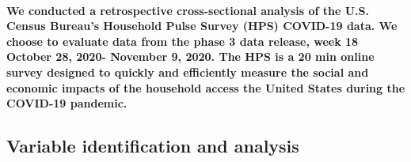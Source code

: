\documentclass[
  12pt,
]{article}
\begin{document}
\hypertarget{we-conducted-a-retrospective-cross-sectional-analysis-of-the-u.s.-census-bureaus-household-pulse-survey-hps-covid-19-data.-we-choose-to-evaluate-data-from-the-phase-3-data-release-week-18-october-28-2020--november-9-2020.-the-hps-is-a-20-min-online-survey-designed-to-quickly-and-efficiently-measure-the-social-and-economic-impacts-of-the-household-access-the-united-states-during-the-covid-19-pandemic.}{%
\paragraph{We conducted a retrospective cross-sectional analysis of the
U.S. Census Bureau's Household Pulse Survey (HPS) COVID-19 data. We
choose to evaluate data from the phase 3 data release, week 18 October
28, 2020- November 9, 2020. The HPS is a 20 min online survey designed
to quickly and efficiently measure the social and economic impacts of
the household access the United States during the COVID-19
pandemic.}\label{we-conducted-a-retrospective-cross-sectional-analysis-of-the-u.s.-census-bureaus-household-pulse-survey-hps-covid-19-data.-we-choose-to-evaluate-data-from-the-phase-3-data-release-week-18-october-28-2020--november-9-2020.-the-hps-is-a-20-min-online-survey-designed-to-quickly-and-efficiently-measure-the-social-and-economic-impacts-of-the-household-access-the-united-states-during-the-covid-19-pandemic.}}

\hypertarget{variable-identification-and-analysis}{%
\subsection{Variable identification and
analysis}\label{variable-identification-and-analysis}}
\end{document}
